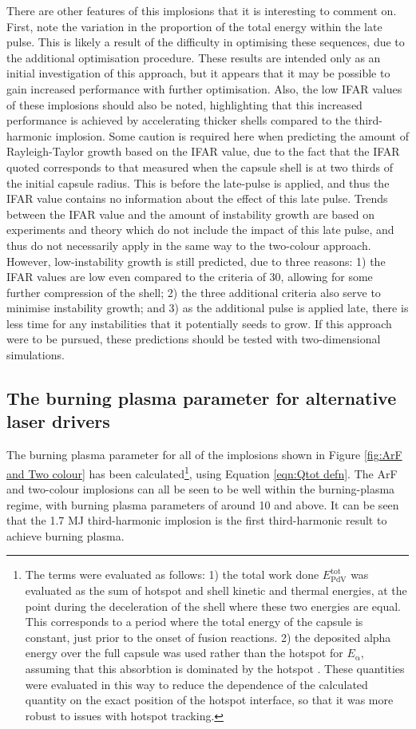 There are other features of this implosions that it is interesting to comment on. First, note the variation in the proportion of the total energy within the late pulse. This is likely a result of the difficulty in optimising these sequences, due to the additional optimisation procedure. These results are intended only as an initial investigation of this approach, but it appears that it may be possible to gain increased performance with further optimisation. Also, the low IFAR values of these implosions should also be noted, highlighting that this increased performance is achieved by accelerating thicker shells compared to the third-harmonic implosion. Some caution is required here when predicting the amount of Rayleigh-Taylor growth based on the IFAR value, due to the fact that the IFAR quoted corresponds to that measured when the capsule shell is at two thirds of the initial capsule radius. This is before the late-pulse is applied, and thus the IFAR value contains no information about the effect of this late pulse. Trends between the IFAR value and the amount of instability growth are based on experiments and theory which do not include the impact of this late pulse, and thus do not necessarily apply in the same way to the two-colour approach. However, low-instability growth is still predicted, due to three reasons: 1) the IFAR values are low even compared to the criteria of 30, allowing for some further compression of the shell; 2) the three additional criteria also serve to minimise instability growth; and 3) as the additional pulse is applied late, there is less time for any instabilities that it potentially seeds to grow. If this approach were to be pursued, these predictions should be tested with two-dimensional simulations.

\subsection{The burning plasma parameter for alternative laser drivers}

The burning plasma parameter for all of the implosions shown in Figure \ref{fig:ArF and Two colour} has been calculated\footnote{The terms were evaluated as follows: 1) the total work done $E^\mathrm{{tot}}_{\mathrm{PdV}}$ was evaluated as the sum of hotspot and shell kinetic and thermal energies, at the point during the deceleration of the shell where these two energies are equal. This corresponds to a period where the total energy of the capsule is constant, just prior to the onset of fusion reactions. 2) the deposited alpha energy over the full capsule was used rather than the hotspot for $E_\mathrm{\alpha}$, assuming that this absorbtion is dominated by the hotspot \cite{Christopherson2018}. These quantities were evaluated in this way to reduce the dependence of the calculated quantity on the exact position of the hotspot interface, so that it was more robust to issues with hotspot tracking.}, using Equation \ref{eqn:Qtot defn}. The ArF and two-colour implosions can all be seen to be well within the burning-plasma regime, with burning plasma parameters of around 10 and above. It can be seen that the 1.7 MJ third-harmonic implosion is the first third-harmonic result to achieve burning plasma.

